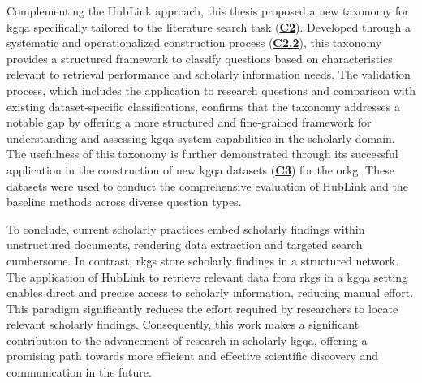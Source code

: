 Complementing the HubLink approach, this thesis proposed a new taxonomy for \gls{kgqa} specifically tailored to the literature search task (\hyperref[enum:c2]{\textbf{C2}}). Developed through a systematic and operationalized construction process (\hyperref[enum:c2]{\textbf{C2.2}}), this taxonomy provides a structured framework to classify questions based on characteristics relevant to retrieval performance and scholarly information needs. The validation process, which includes the application to research questions and comparison with existing dataset-specific classifications, confirms that the taxonomy addresses a notable gap by offering a more structured and fine-grained framework for understanding and assessing \gls{kgqa} system capabilities in the scholarly domain. The usefulness of this taxonomy is further demonstrated through its successful application in the construction of new \gls{kgqa} datasets (\hyperref[enum:c3]{\textbf{C3}}) for the \gls{orkg}. These datasets were used to conduct the comprehensive evaluation of HubLink and the baseline methods across diverse question types. 

To conclude, current scholarly practices embed scholarly findings within unstructured documents, rendering data extraction and targeted search cumbersome. In contrast, \glspl{rkg} store scholarly findings in a structured network. The application of HubLink to retrieve relevant data from \glspl{rkg} in a \gls{kgqa} setting enables direct and precise access to scholarly information, reducing manual effort. This paradigm significantly reduces the effort required by researchers to locate relevant scholarly findings. Consequently, this work makes a significant contribution to the advancement of research in scholarly \gls{kgqa}, offering a promising path towards more efficient and effective scientific discovery and communication in the future.



% 



